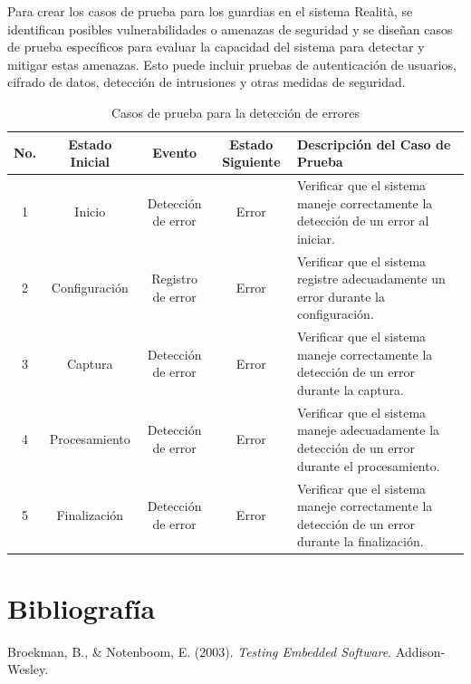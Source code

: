 \documentclass[12pt,a4paper, twoside]{article} %
\begin{document}
Para crear los casos de prueba para los guardias en el sistema Realità, se identifican posibles vulnerabilidades o amenazas de seguridad y se diseñan casos de prueba específicos para evaluar la capacidad del sistema para detectar y mitigar estas amenazas. Esto puede incluir pruebas de autenticación de usuarios, cifrado de datos, detección de intrusiones y otras medidas de seguridad.


\begin{table}[htbp]
    \centering
    \caption{Casos de prueba para la detección de errores}
    \label{tab:casos_prueba_errores}
    \begin{tabular}{|c|c|c|c|p{4cm}|}
    \hline
    \textbf{No.} & \textbf{Estado Inicial} & \textbf{Evento} & \textbf{Estado Siguiente} & \textbf{Descripción del Caso de Prueba} \\
    \hline
    1 & Inicio & Detección de error & Error & Verificar que el sistema maneje correctamente la detección de un error al iniciar. \\
    \hline
    2 & Configuración & Registro de error & Error & Verificar que el sistema registre adecuadamente un error durante la configuración. \\
    \hline
    3 & Captura & Detección de error & Error & Verificar que el sistema maneje correctamente la detección de un error durante la captura. \\
    \hline
    4 & Procesamiento & Detección de error & Error & Verificar que el sistema maneje adecuadamente la detección de un error durante el procesamiento. \\
    \hline
    5 & Finalización & Detección de error & Error & Verificar que el sistema maneje correctamente la detección de un error durante la finalización. \\
    \hline
    \end{tabular}
\end{table}




\newpage


\section{Bibliografía}


Broekman, B., \& Notenboom, E. (2003). \textit{Testing Embedded Software}. Addison-Wesley.
\end{document}
